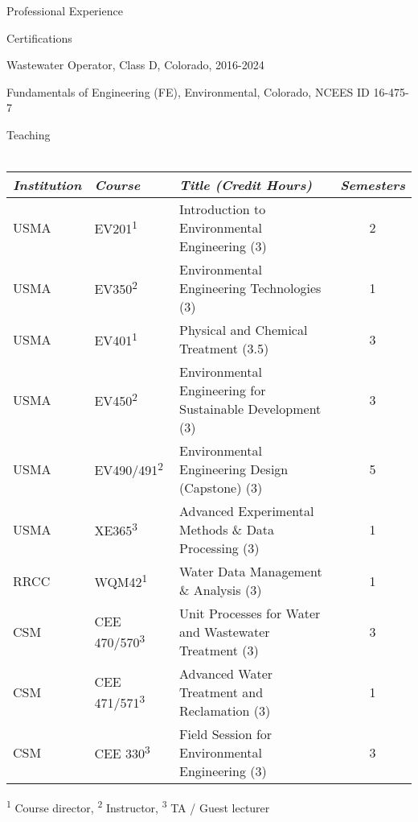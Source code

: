 \documentclass{resume} %
\begin{document}
\begin{rSection}{Professional Experience}
\begin{rSection}{Certifications}

Wastewater Operator, Class D, Colorado, 2016-2024

Fundamentals of Engineering (FE), Environmental, Colorado, NCEES ID 16-475-7
\end{rSection}


\begin{rSection}{Teaching}
\\
\\

\begin{table}[h]
\centering
\begin{tabular}{lllc}
\toprule
  \emph{Institution} & \emph{Course} & \emph{Title (Credit Hours)} & \emph{Semesters}\\
\midrule			
  USMA & EV201\textsuperscript{1}& Introduction to Environmental Engineering (3) & 2  \\
  USMA & EV350\textsuperscript{2}&Environmental Engineering Technologies (3) & 1 \\
  USMA & EV401\textsuperscript{1} & Physical and Chemical Treatment (3.5) & 3  \\
  USMA & EV450\textsuperscript{2} & Environmental Engineering for Sustainable Development (3) & 3 \\
  USMA & EV490/491\textsuperscript{2} & Environmental Engineering Design (Capstone) (3) & 5  \\
  USMA & XE365\textsuperscript{3} & Advanced Experimental Methods \& Data Processing (3) & 1  \\
  RRCC & WQM42\textsuperscript{1} & Water Data Management \& Analysis (3) & 1 \\
  CSM & CEE 470/570\textsuperscript{3} & Unit Processes for Water and Wastewater Treatment (3) & 3 \\
  CSM & CEE 471/571\textsuperscript{3} & Advanced Water Treatment and Reclamation (3) & 1 \\
  CSM & CEE 330\textsuperscript{3} & Field Session for Environmental Engineering (3) & 3  \\
\bottomrule
\end{tabular}

\smallskip\footnotesize{\textsuperscript{1} Course director, \textsuperscript{2} Instructor, \textsuperscript{3} TA / Guest lecturer}


\end{table}
\end{rSection}
\end{rSection}
\end{document}
